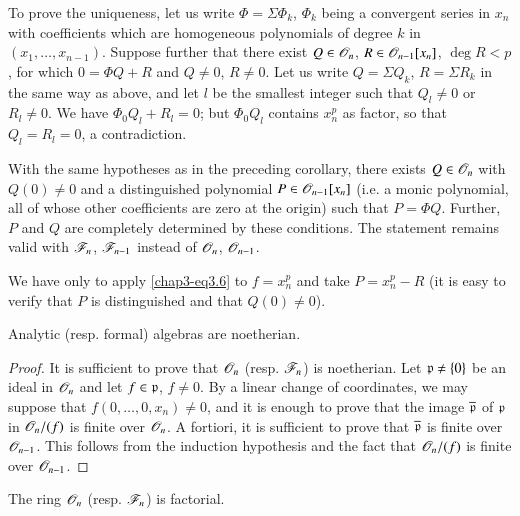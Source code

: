 To prove the uniqueness, let us write $\Phi=\Sigma \Phi_{k}$, $\Phi_{k}$ being a convergent series in $x_{n}$ with coefficients which are homogeneous polynomials of degree $k$ in $(x_{1},\ldots,x_{n-1})$. Suppose further that there exist $Q\in \mathscr{O}_{n}$, $R\in \mathscr{O}_{n-1}[x_{n}]$, $\deg R<p$, for which $0=\Phi Q+R$ and $Q\neq 0$, $R\neq 0$. Let us write $Q=\Sigma Q_{k}$, $R=\Sigma R_{k}$ in the same way as above, and let $l$ be the smallest integer such that $Q_{l}\neq 0$ or $R_{l}\neq 0$. We have $\Phi_{0}Q_{l}+R_{l}=0$; but $\Phi_{0}Q_{l}$ contains $x^{p}_{n}$ as factor, so that $Q_{l}=R_{l}=0$, a contradiction.

\begin{corollary}[Weierstrass]\label{chap3-coro3.7}
With the same hypotheses as in the preceding corollary, there exists $Q\in \mathscr{O}_{n}$ with $Q(0)\neq 0$ and a distinguished polynomial $P\in \mathscr{O}_{n-1}[x_{n}]$ (i.e. a monic polynomial, all of whose other coefficients are zero at the origin) such that $P=\Phi Q$. Further, $P$ and $Q$ are completely determined by these conditions. The statement remains valid with $\mathscr{F}_{n}$, $\mathscr{F}_{n-1}$ instead of $\mathscr{O}_{n}$, $\mathscr{O}_{n-1}$.
\end{corollary}

We have only to apply \eqref{chap3-eq3.6} to $f=x^{p}_{n}$ and take $P=x^{p}_{n}-R$ (it is easy to verify that $P$ is distinguished and that $Q(0)\neq 0$).

\begin{theorem}\label{chap3-thm3.8}
Analytic (resp. formal) algebras are noetherian.
\end{theorem}

\begin{proof}
It is sufficient to prove that $\mathscr{O}_{n}$ (resp. $\mathscr{F}_{n}$) is noetherian. Let $\mathfrak{p}\neq \{0\}$ be an ideal in $\mathscr{O}_{n}$ and let $f\in \mathfrak{p}$, $f\neq 0$. By a linear change of coordinates, we may suppose that $f(0,\ldots,0,x_{n})\neq 0$, and it is enough to prove that the image $\overline{\mathfrak{p}}$ of $\mathfrak{p}$ in $\mathscr{O}_{n}/(f)$ is finite over $\mathscr{O}_{n}$. A fortiori, it is sufficient to prove that $\overline{\mathfrak{p}}$ is finite over $\mathscr{O}_{n-1}$. This follows from the induction hypothesis and the fact that $\mathscr{O}_{n}/(f)$ is finite over $\mathscr{O}_{n-1}$.
\end{proof}

\begin{theorem}\label{chap3-thm3.9}
The ring $\mathscr{O}_{n}$ (resp. $\mathscr{F}_{n}$) is factorial.
\end{theorem}

